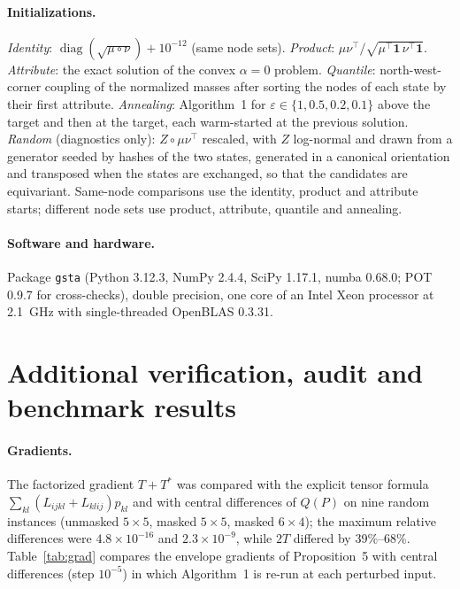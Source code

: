 \documentclass[12pt]{article}
\begin{document}
\paragraph{Initializations.} \emph{Identity}: $\operatorname{diag}(\sqrt{\mu\circ\nu})+10^{-12}$ (same node sets). \emph{Product}: $\mu\nu^\top/\sqrt{\mu^\top\mathbf1\,\nu^\top\mathbf1}$. \emph{Attribute}: the exact solution of the convex $\alpha=0$ problem. \emph{Quantile}: north-west-corner coupling of the normalized masses after sorting the nodes of each state by their first attribute. \emph{Annealing}: Algorithm~1 for $\varepsilon\in\{1,0.5,0.2,0.1\}$ above the target and then at the target, each warm-started at the previous solution. \emph{Random} (diagnostics only): $Z\circ\mu\nu^\top$ rescaled, with $Z$ log-normal and drawn from a generator seeded by hashes of the two states, generated in a canonical orientation and transposed when the states are exchanged, so that the candidates are equivariant. Same-node comparisons use the identity, product and attribute starts; different node sets use product, attribute, quantile and annealing.

\paragraph{Software and hardware.} Package \texttt{gsta} (Python 3.12.3, NumPy 2.4.4, SciPy 1.17.1, numba 0.68.0; POT 0.9.7 for cross-checks), double precision, one core of an Intel Xeon processor at 2.1~GHz with single-threaded OpenBLAS 0.3.31.

\section{Additional verification, audit and benchmark results}\label{sec:verif}

\paragraph{Gradients.} The factorized gradient $T+T^\ast$ was compared with the explicit tensor formula $\sum_{kl}(L_{ijkl}+L_{klij})p_{kl}$ and with central differences of $Q(P)$ on nine random instances (unmasked $5\times5$, masked $5\times5$, masked $6\times4$); the maximum relative differences were $4.8\times10^{-16}$ and $2.3\times10^{-9}$, while $2T$ differed by 39\%--68\%. Table~\ref{tab:grad} compares the envelope gradients of Proposition~5 with central differences (step $10^{-5}$) in which Algorithm~1 is re-run at each perturbed input.
\end{document}
